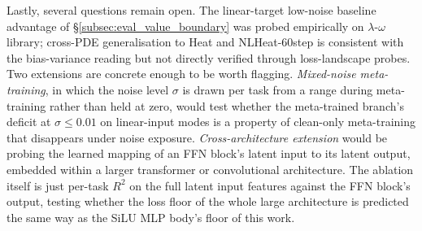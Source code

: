 \documentclass[10pt,journal,compsoc]{IEEEtran}
\begin{document}
Lastly, several questions remain open. The linear-target low-noise baseline
advantage of \S\ref{subsec:eval_value_boundary} was probed empirically on
$\lambda$-$\omega$ library; cross-PDE generalisation to Heat and NLHeat-60step
is consistent with the bias-variance reading but not directly verified through
loss-landscape probes. Two extensions are concrete enough to be worth flagging.
\emph{Mixed-noise meta-training}, in which the noise level $\sigma$ is drawn
per task from a range during meta-training rather than held at zero, would test
whether the meta-trained branch's deficit at $\sigma \leq 0.01$ on linear-input
modes is a property of clean-only meta-training that disappears under noise
exposure. \emph{Cross-architecture extension} would be probing the learned
mapping of an FFN block's latent input to its latent output, embedded within a
larger transformer or convolutional architecture. The ablation itself is just
per-task $R^2$ on the full latent input features against the FFN block's
output, testing whether the loss floor of the whole large architecture is
predicted the same way as the SiLU MLP body's floor of this work.




%
%
%
\end{document}
